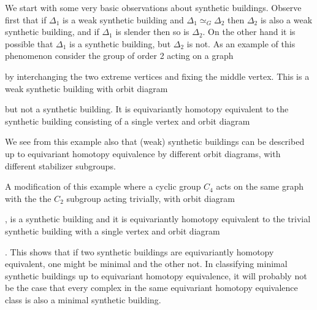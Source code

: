 \documentclass[12pt]{amsart}
\theoremstyle{plain}
\theoremstyle{definition}
\theoremstyle{remark}
\numberwithin{equation}{section}
\begin{document}
We start with some very basic observations about synthetic buildings. Observe first that if $\Delta_1$ is a weak synthetic building and $\Delta_1\simeq_G\Delta_2$ then $\Delta_2$ is also a weak synthetic building, and if $\Delta_1$ is slender then so is $\Delta_2$. On the other hand it is possible that $\Delta_1$ is a synthetic building, but $\Delta_2$ is not. As an example of this phenomenon consider the group of order 2 acting on a graph
by interchanging the two extreme vertices and fixing the middle vertex. This is a weak synthetic building with orbit diagram
but not a synthetic building. It is equivariantly homotopy equivalent to the synthetic building consisting of a single vertex and orbit diagram
We see from this example also that (weak) synthetic buildings can be described up to equivariant homotopy equivalence by different orbit diagrams, with different stabilizer subgroups.

A modification of this example where a cyclic group $C_4$ acts on the same graph with the the $C_2$ subgroup acting trivially, with orbit diagram     ,
is a synthetic building and it is equivariantly homotopy equivalent to the trivial synthetic building with a single vertex and orbit diagram
    .
 This shows that if two synthetic buildings are equivariantly homotopy equivalent, one might be minimal and the other not. In classifying minimal synthetic buildings up to equivariant homotopy equivalence, it will probably not be the case that every complex in the same equivariant homotopy equivalence class is also a minimal synthetic building.
\end{document}
